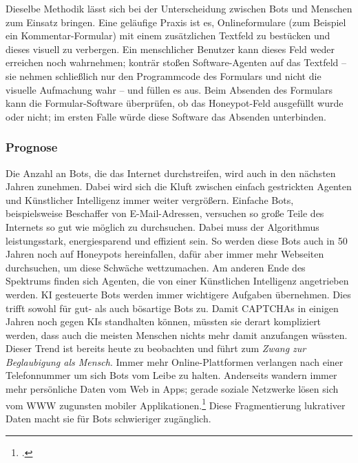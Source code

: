 Dieselbe Methodik lässt sich bei der Unterscheidung zwischen Bots und Menschen
zum Einsatz bringen. Eine geläufige Praxis ist es, Onlineformulare (zum
Beispiel ein Kommentar-Formular) mit einem zusätzlichen Textfeld zu bestücken
und dieses visuell zu verbergen. Ein menschlicher Benutzer kann dieses Feld
weder erreichen noch wahrnehmen; konträr stoßen Software-Agenten auf das
Textfeld -- sie nehmen schließlich nur den Programmcode des Formulars und nicht
die visuelle Aufmachung wahr -- und füllen es aus. Beim Absenden des Formulars
kann die Formular-Software überprüfen, ob das Honeypot-Feld ausgefüllt wurde
oder nicht; im ersten Falle würde diese Software das Absenden unterbinden.

\subsubsection{Prognose}
\label{ssub:prognose}

Die Anzahl an Bots, die das Internet durchstreifen, wird auch in den nächsten
Jahren zunehmen. Dabei wird sich die Kluft zwischen einfach gestrickten Agenten
und Künstlicher Intelligenz immer weiter vergrößern. Einfache Bots,
beispielsweise Beschaffer von E-Mail-Adressen, versuchen so große Teile des
Internets so gut wie möglich zu durchsuchen. Dabei muss der Algorithmus
leistungsstark, energiesparend und effizient sein. So werden diese Bots auch in
50 Jahren noch auf Honeypots hereinfallen, dafür aber immer mehr Webseiten
durchsuchen, um diese Schwäche wettzumachen. Am anderen Ende des Spektrums
finden sich Agenten, die von einer Künstlichen Intelligenz angetrieben werden.
KI gesteuerte Bots werden immer wichtigere Aufgaben übernehmen. Dies trifft
sowohl für gut- als auch bösartige Bots zu. Damit CAPTCHAs in einigen Jahren
noch gegen KIs standhalten können, müssten sie derart kompliziert werden, dass
auch die meisten Menschen nichts mehr damit anzufangen wüssten. Dieser Trend
ist bereits heute zu beobachten und führt zum \emph{Zwang zur Beglaubigung als
Mensch}. Immer mehr Online-Plattformen verlangen nach einer Telefonnummer um
sich Bots vom Leibe zu halten. Anderseits wandern immer mehr persönliche Daten
vom Web in Apps; gerade soziale Netzwerke lösen sich vom WWW zugunsten mobiler
Applikationen.\footcite{timeOnSmartphone} Diese Fragmentierung lukrativer Daten
macht sie für Bots schwieriger zugänglich.
